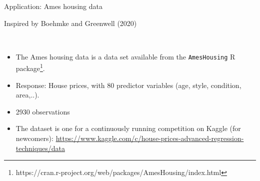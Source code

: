 \documentclass[
  10pt,
  ignorenonframetext,
]{beamer}
\providecommand{\tightlist}{%
  \setlength{\itemsep}{0pt}\setlength{\parskip}{0pt}}
\begin{document}
\begin{frame}[fragile]
\begin{block}{Application: Ames housing data}
\protect\hypertarget{application-ames-housing-data}{}
\scriptsize

Inspired by Boehmke and Greenwell (2020)

\normalsize

\(~\)

\begin{itemize}
\tightlist
\item
  The Ames housing data is a data set available from the
  \texttt{AmesHousing} R
  package\footnote{https://cran.r-project.org/web/packages/AmesHousing/index.html}.
\end{itemize}

\vspace{2mm}

\begin{itemize}
\tightlist
\item
  Response: House prices, with 80 predictor variables (age, style,
  condition, area,..).
\end{itemize}

\vspace{2mm}

\begin{itemize}
\tightlist
\item
  2930 observations
\end{itemize}

\vspace{2mm}

\begin{itemize}
\tightlist
\item
  The dataset is one for a continuously running competition on Kaggle
  (for newcomers):
  \url{https://www.kaggle.com/c/house-prices-advanced-regression-techniques/data}
\end{itemize}
\end{block}
\end{frame}
\end{document}
